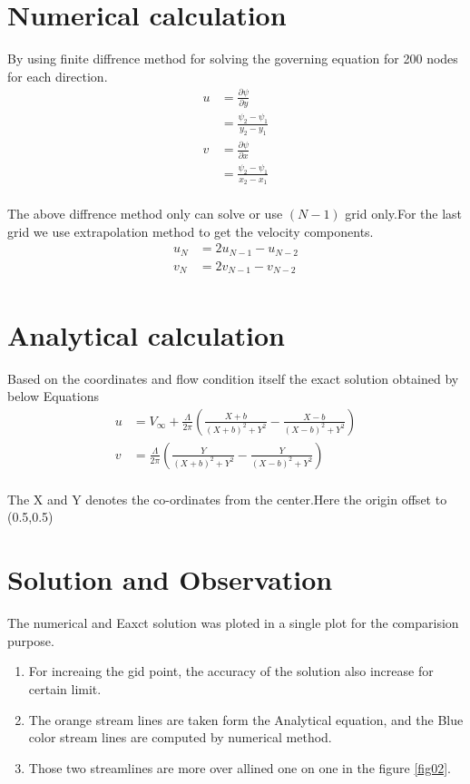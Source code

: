 \documentclass[conf]{new-aiaa}
\begin{document}
\section{Numerical calculation}
\par By using finite diffrence method for solving the governing equation for 200 nodes for each direction.\\
\begin{align*}
	u & = \frac{\partial \psi}{\partial y} \\
	& = \frac{\psi_2 - \psi_1}{y_2-y_1} \\
	v & = \frac{\partial \psi}{\partial x} \\
	& = \frac{\psi_2 - \psi_1}{x_2-x_1} \\
\end{align*}
\par The above diffrence method only can solve or use $(N-1)$ grid only.For the last grid we use extrapolation method to get the velocity components.\\
\begin{align*}
	u_N & = 2 u_{N-1} - u_{N-2}\\
	v_N & = 2 v_{N-1} - v_{N-2}\\
\end{align*}

\section{Analytical calculation}
\par Based on the coordinates and flow condition itself the exact solution obtained by below Equations \\
\begin{align*}
	u & = V_\infty + \frac{\Lambda}{2 \pi} \left (\frac{X+b}{(X+b)^2+Y^2}-\frac{X-b}{(X-b)^2+Y^2} \right ) \\
	v & = \frac{\Lambda}{2 \pi} \left (\frac{Y}{(X+b)^2+Y^2}-\frac{Y}{(X-b)^2+Y^2} \right ) \\
\end{align*}
\par The X and Y denotes the co-ordinates from the center.Here the origin offset to (0.5,0.5) \\

\section{Solution and Observation}
\par The numerical and Eaxct solution was ploted in a single plot for the comparision purpose.\\
\begin{enumerate}
	\item For increaing the gid point, the accuracy of the solution also increase for certain limit.
	\item The orange stream lines are taken form the Analytical equation, and the Blue color stream lines are computed by numerical method.
	\item Those two streamlines are more over allined one on one in the figure \ref{fig02}.
\end{enumerate}
\end{document}
